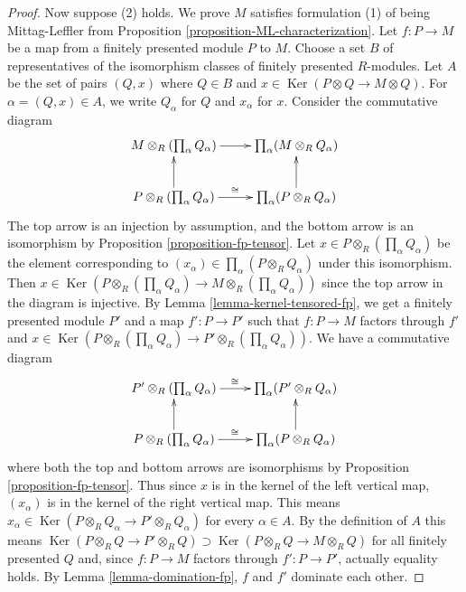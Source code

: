 \documentclass{amsart}
\theoremstyle{plain}
\theoremstyle{definition}
\theoremstyle{remark}
\numberwithin{equation}{subsection}
\def\Ker{\mathop{\mathrm{Ker}}}
\begin{document}
\begin{proof}
\medskip\noindent
Now suppose (2) holds. We prove $M$ satisfies formulation (1) of being
Mittag-Leffler from Proposition \ref{proposition-ML-characterization}.  Let $f:
P \to M$ be a map from a finitely presented module $P$ to $M$.  Choose
a set $B$ of representatives of the isomorphism classes of finitely presented
$R$-modules. Let $A$ be the set of pairs $(Q, x)$ where $Q \in B$ and $x \in
\Ker(P \otimes Q \to M \otimes Q)$.  For $\alpha = (Q, x) \in A$, we
write $Q_{\alpha}$ for $Q$ and $x_{\alpha}$ for $x$.  Consider the commutative
diagram
$$
\xymatrix{
M \otimes_R (\prod_{\alpha} Q_{\alpha}) \ar[r] &
\prod_{\alpha} (M \otimes_R Q_{\alpha}) \\
P \otimes_R (\prod_{\alpha} Q_{\alpha}) \ar[r]^{\cong} \ar[u] &
\prod_{\alpha} (P \otimes_R Q_{\alpha}) \ar[u] .
}
$$
The top arrow is an injection by assumption, and the bottom arrow is an
isomorphism by Proposition \ref{proposition-fp-tensor}.  Let $x \in P
\otimes_R (\prod_{\alpha} Q_{\alpha})$ be the element corresponding to
$(x_{\alpha}) \in \prod_{\alpha} (P \otimes_R Q_{\alpha})$ under this
isomorphism.  Then $x \in \Ker( P \otimes_R (\prod_{\alpha} Q_{\alpha})
\to M \otimes_R (\prod_{\alpha} Q_{\alpha}))$ since the top arrow in
the diagram is injective.  By Lemma \ref{lemma-kernel-tensored-fp}, we get a
finitely presented module $P'$ and a map $f': P \to P'$ such that $f: P
\to M$ factors through $f'$ and $x \in \Ker(P \otimes_R
(\prod_{\alpha} Q_{\alpha}) \to P' \otimes_R (\prod_{\alpha}
Q_{\alpha}))$.  We have a commutative diagram
$$
\xymatrix{
P' \otimes_R (\prod_{\alpha} Q_{\alpha}) \ar[r]^{\cong} &
\prod_{\alpha} (P' \otimes_R Q_{\alpha}) \\
P \otimes_R (\prod_{\alpha} Q_{\alpha}) \ar[r]^{\cong} \ar[u] &
\prod_{\alpha} (P \otimes_R Q_{\alpha}) \ar[u] .
}
$$
where both the top and bottom arrows are isomorphisms by Proposition
\ref{proposition-fp-tensor}.  Thus since $x$ is in the kernel of the left
vertical map, $(x_{\alpha})$ is in the kernel of the right vertical map.  This
means $x_{\alpha} \in \Ker(P \otimes_R Q_{\alpha} \to P' \otimes_R
Q_{\alpha})$ for every $\alpha \in A$.  By the definition of $A$ this means
$\Ker(P \otimes_R Q \to P' \otimes_R Q) \supset \Ker(P \otimes_R
Q \to M \otimes_R Q)$ for all finitely presented $Q$ and, since $f: P
\to M$ factors through $f': P \to P'$, actually equality holds.
 By Lemma \ref{lemma-domination-fp}, $f$ and $f'$ dominate each other.
\end{proof}
\end{document}
